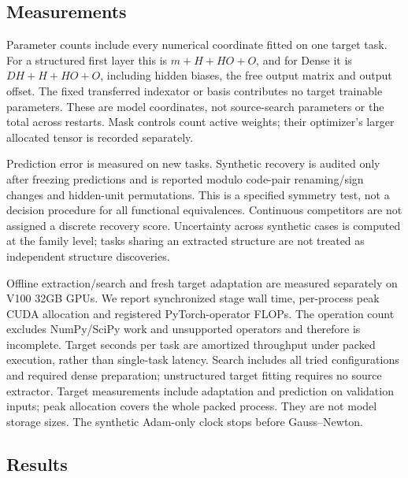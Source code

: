 \subsection{Measurements}

Parameter counts include every numerical coordinate fitted on one target
task. For a structured first layer this is $m+H+HO+O$, and for Dense it
is $DH+H+HO+O$, including hidden biases, the free output matrix and output
offset. The fixed transferred indexator or basis contributes no target
trainable parameters. These are model coordinates, not source-search
parameters or the total across restarts. Mask controls count active
weights; their optimizer's larger allocated tensor is recorded separately.

Prediction error is measured on new tasks. Synthetic recovery is
audited only after freezing predictions and is reported modulo code-pair
renaming/sign changes and hidden-unit permutations. This is a specified
symmetry test, not a decision procedure for all functional equivalences.
Continuous competitors are not assigned a discrete recovery score.
Uncertainty across synthetic cases is computed at the family level;
tasks sharing an extracted structure are not treated as independent
structure discoveries.

Offline extraction/search and fresh target adaptation are measured
separately on V100 32GB GPUs. We report synchronized stage wall time,
per-process peak CUDA allocation and registered PyTorch-operator
FLOPs. The operation count excludes NumPy/SciPy work and unsupported
operators and therefore is incomplete. Target seconds per task are
amortized throughput under packed execution, rather than single-task
latency. Search includes all tried configurations and required dense
preparation; unstructured target fitting requires no source extractor.
Target measurements include adaptation and prediction on validation inputs;
peak allocation covers the whole packed process. They are not model
storage sizes. The synthetic Adam-only clock stops before Gauss--Newton.

\subsection{Results}


